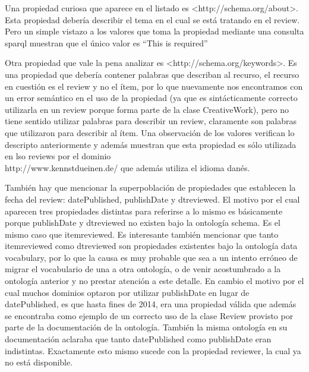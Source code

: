  Una propiedad curiosa que aparece en el listado es <http://schema.org/about>. Esta propiedad debería describir el tema en el cual 
 se está tratando en el review. Pero un simple vistazo a los valores que toma la propiedad mediante una consulta sparql muestran que 
 el único valor es ``This is required''
 
 Otra propiedad que vale la pena analizar es <http://schema.org/keywords>. Es una propiedad que debería contener palabras que describan al recurso, 
 el recurso en cuestión es el review y no el ítem, por lo que nuevamente nos encontramos con un error semántico en el uso de la propiedad (ya que es sintácticamente 
 correcto utilizarla en un review porque forma parte de la clase CreativeWork), pero no tiene sentido utilizar palabras para describir un review, claramente 
 son palabras que utilizaron para describir al ítem.
 Una observación de los valores verifican lo descripto anteriormente y además muestran que esta propiedad es sólo utilizada en lso reviews por el dominio 
 \\\noindent http://www.kennstdueinen.de/ que además utiliza el idioma danés.
 
 También hay que mencionar la superpoblación de propiedades que establecen la fecha del review: datePublished, publishDate y dtreviewed.
 El motivo por el cual aparecen tres propiedades distintas para referirse a lo mismo es básicamente porque publishDate y dtreviewed no existen bajo la 
 ontología schema. Es el mismo caso que itemreviewed. 
 Es interesante también mencionar que tanto itemreviewed como dtreviewed son propiedades existentes bajo la ontología data vocabulary, 
 por lo que la causa es muy probable que sea a un intento erróneo de migrar el vocabulario de una a otra ontología, o de venir acostumbrado a la 
 ontología anterior y no prestar atención a este detalle.
 En cambio el motivo por el cual muchos dominios optaron por utilizar publishDate en lugar de datePublished, es que hasta fines de 2014, 
 era una propiedad válida que además se encontraba como ejemplo de un correcto uso de la clase Review provisto por parte de la documentación 
 de la ontología. 
 También la misma ontología en su documentación aclaraba que tanto datePublished como publishDate eran indistintas.
 Exactamente esto mismo sucede con la propiedad reviewer, la cual ya no está disponible.
 
